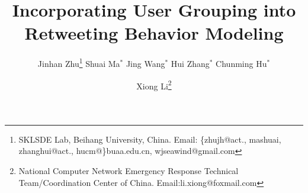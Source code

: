 \documentclass[twoside,leqno,twocolumn]{article}
\begin{document}
\begin{CJK*}{GBK}{song}


\newtheorem{definition}{Definition}
\newtheorem{problem}{Problem}
\newtheorem{remark}{Remark}
%
\newcommand{\sys}{\uppercase{G}\lowercase{ru}\uppercase{B}\lowercase{a}}
\newcommand{\tbc}{\textcolor{blue}{[To Be Completed]}}
\newcommand{\refe}{\textcolor{blue}{[reference]}}
\newcommand{\retg}{retweeting}
\newcommand{\retgs}{retweetings}
\newcommand{\Retg}{Retweeting}
\newcommand{\retd}{retweeted}
\newcommand{\ret}{retweet}
\newcommand{\od}{Euclidean distance}
\newcommand{\hd}{Hamiltonian distance}
\newcommand{\gd}{GruBa Distance}



\newcommand{\stitle}[1]{\vspace{0.75ex}\noindent{\bf #1}}
\newcommand{\stab}{\rule{0pt}{8pt}\\[-1.6ex]}
\newcommand{\beihang}{SKLSDE Lab, Beihang University, China. Email: \{zhujh@act., mashuai, zhanghui@act., hucm@\}buaa.edu.cn, wjseawind@gmail.com}
\newcommand{\ackfunding}{Supported by NSFC (U1636210, 61421003, 61403090, U1636123), Beijing Advanced Innovation Center for Big Data and Brain Computing.}

\begin{comment}
\title{\Large Incorporating User Grouping into \Retg{} Behavior Modeling}
\author{Jinhan Zhu\thanks{\beihang}\hspace{2ex} Shuai Ma$^{\dag}$\hspace{2ex} Jing Wang$^{\dag}$\hspace{2ex} Hui Zhang$^{\dag}$\hspace{2ex} Chunming Hu$^{\dag}$\\
\and
\hspace{-2ex}Xiong Li\thanks{National Computer Network Emergency Response Technical Team/Coordination Center of China. Email:li.xiong@foxmail.com}}
\date{}	

\date{}	
\end{comment}

\title{\Large Incorporating User Grouping into \Retg{} Behavior Modeling}
\author{Jinhan Zhu\thanks{\beihang}\hspace{2ex} Shuai Ma$^{*}$\hspace{2ex} Jing Wang$^{*}$\hspace{2ex} Hui Zhang$^{*}$\hspace{2ex} Chunming Hu$^{*}$\\
\and
\hspace{-2ex}Xiong Li\thanks{National Computer Network Emergency Response Technical Team/Coordination Center of China. Email:li.xiong@foxmail.com}}
\date{}	


\end{CJK*}
\end{document}
